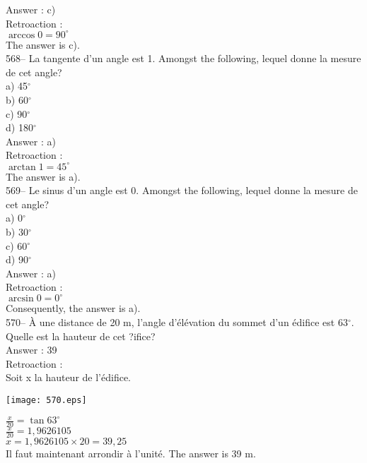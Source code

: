 ﻿\documentclass[letterpaper, 12pt]{article}
\begin{document}
Answer : c)\\

Retroaction : \\
$\arccos 0 = 90^{\circ}$\\
The answer is c).\\

568-- La tangente d'un angle est 1.  Amongst the following, lequel
donne la mesure de cet angle?\\
a) 45$^{\circ}$\\
b) 60$^{\circ}$\\
c) 90$^{\circ}$\\
d) 180$^{\circ}$\\

Answer : a)\\

Retroaction : \\
$\arctan 1 = 45^{\circ}$\\
The answer is a).\\

569-- Le sinus d'un angle est 0.  Amongst the following, lequel
donne la mesure de cet angle?\\
a) 0$^{\circ}$\\
b) 30$^{\circ}$\\
c) 60$^{\circ}$\\
d) 90$^{\circ}$\\

Answer : a)\\

Retroaction : \\
$\arcsin 0 = 0^{\circ}$\\
Consequently, the answer is a).\\

570-- \`A une distance de 20 m, l'angle d'\'el\'evation du sommet d'un
\'edifice est 63$^{\circ}$. Quelle est la hauteur de cet ?ifice?\\

Answer : 39  \\

Retroaction : \\
Soit x la hauteur de l'\'edifice.\\[2mm]   \begin{center}
    \texttt{[image: 570.eps]}
    \end{center}
$\frac{x}{20}=\tan 63^{\circ}$\\[2mm]
$\frac{x}{20}=1,9626105$\\[2mm]
$x=1,9626105\times20=39,25$\\[2mm]
Il faut maintenant arrondir \`a l'unit\'e.
The answer is 39 m.\\
\end{document}
